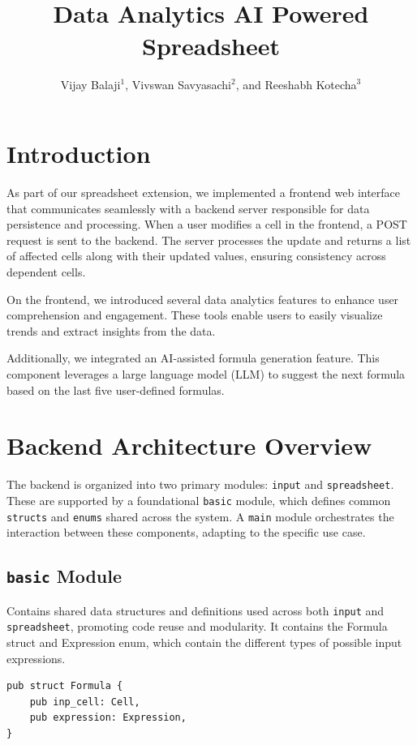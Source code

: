 \documentclass[12pt,a4paper]{cibb}
\title{\Large $\ $\\ \bf Data Analytics AI Powered Spreadsheet}
\author{\large Vijay Balaji$^1$, Vivswan Savyasachi$^{2}$, and Reeshabh Kotecha$^{3}$}
\begin{document}
\thispagestyle{myheadings}
\pagestyle{myheadings}



\section{\bf Introduction}


As part of our spreadsheet extension, we implemented a frontend web interface that communicates seamlessly with a backend server responsible for data persistence and processing. When a user modifies a cell in the frontend, a POST request is sent to the backend. The server processes the update and returns a list of affected cells along with their updated values, ensuring consistency across dependent cells.

On the frontend, we introduced several data analytics features to enhance user comprehension and engagement. These tools enable users to easily visualize trends and extract insights from the data.

Additionally, we integrated an AI-assisted formula generation feature. This component leverages a large language model (LLM) to suggest the next formula based on the last five user-defined formulas. 

\section{Backend Architecture Overview}

The backend is organized into two primary modules: \texttt{input} and \texttt{spreadsheet}. These are supported by a foundational \texttt{basic} module, which defines common \texttt{structs} and \texttt{enums} shared across the system. A \texttt{main} module orchestrates the interaction between these components, adapting to the specific use case.

\subsection*{\texttt{basic} Module}
Contains shared data structures and definitions used across both \texttt{input} and \texttt{spreadsheet}, promoting code reuse and modularity. It contains the Formula struct and Expression enum, which contain the different types of possible input expressions.

\begin{verbatim}
pub struct Formula {
    pub inp_cell: Cell,
    pub expression: Expression,
}
\end{verbatim}
\end{document}

